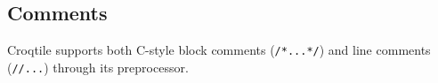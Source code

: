 \subsection*{Comments}

Croqtile supports both C-style block comments (\texttt{/*...*/}) and line comments (\texttt{//...}) through its preprocessor.
